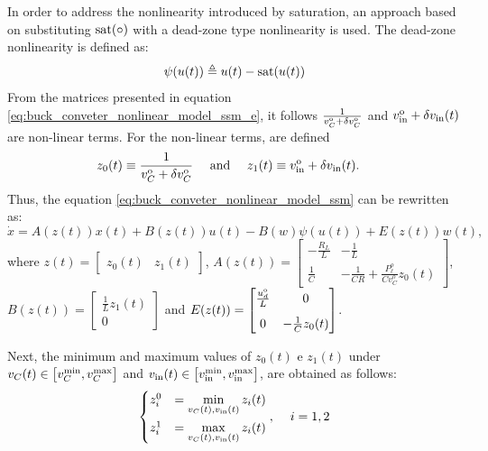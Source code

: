 In order to address the nonlinearity introduced by saturation, an approach based on substituting ${\rm sat(\circ)}$ with a dead-zone type nonlinearity is used. The dead-zone nonlinearity is defined as:
\begin{equation}
  \psi(u(t)) \triangleq u(t) - {\rm sat}(u(t))
\end{equation}
From the matrices presented in equation \eqref{eq:buck_conveter_nonlinear_model_ssm_e}, it follows $\frac{1}{v_C^{\rm o} + \delta v_C^{\rm o}}$ and $v_{\rm{in}}^{\rm o} +\delta v_{\rm{in}}(t)$ are non-linear terms. For the non-linear terms, are defined
\begin{align}
  z_0(t) & \equiv \frac{1}{v_C^{\rm o} + \delta v_C^{\rm o}}  & \ \mathrm{and}\  &  &
  z_1(t) & \equiv v_{\rm{in}}^{\rm o} +\delta v_{\rm{in}}(t).
\end{align}
Thus, the equation \eqref{eq:buck_conveter_nonlinear_model_ssm} can be rewritten as:
\begin{equation}
  \dot x = A(z(t)) x(t) + B(z(t)) u(t) - B(w) \psi(u(t)) + E(z(t)) w(t),
\end{equation}
where $z(t) = \begin{bmatrix}z_0(t) & z_1(t)\end{bmatrix}$, $A(z(t))  = \begin{bmatrix}
    - \frac{R_L}{L} & - \frac{1}{L}                                       \\[8pt]
    \frac{1}{C}     & - \frac{1}{C R} + \frac{P_{\ell}^o}{C v_C^o} z_0(t)
  \end{bmatrix}$, $B(z(t))  = \begin{bmatrix}
    \frac{1}{L} z_1(t) \\[8pt] 0
  \end{bmatrix}$ and $E(z(t))  = \begin{bmatrix}
    \frac{u_d^{\rm o}}{L} & 0 \\[8pt] 0   & - \frac{1}{C} z_0(t)
  \end{bmatrix}$.

Next, the minimum and maximum values of $z_0(t)$ e $z_1(t)$ under $v_C(t) \in \left[v_C^{\rm{min}}, v_C^{\rm{max}}\right]$ and $v_{\rm{in}}(t) \in \left[v_{\rm{in}}^{\rm{min}}, v_{\rm{in}}^{\rm{max}}\right]$, are obtained as follows:
\begin{equation}
  \begin{cases}
    z_i^0 & = \min\limits_{v_C(t), v_{\rm{in}}(t)} z_i(t) \\[8pt]
    z_i^1 & = \max\limits_{v_C(t), v_{\rm{in}}(t)} z_i(t)
  \end{cases}, \hspace{12pt }i = 1, 2
\end{equation}

